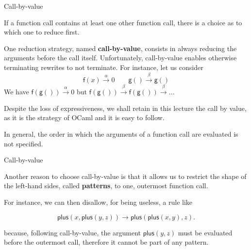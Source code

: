 \documentclass[compress,dvipdfmx]{beamer}
\newcommand{\OCaml}{\textsf{OCaml}\xspace}
\newcommand\fun[1]{\textsf{#1}}
\begin{document}
%
\begin{frame}{Call-by-value}

  If a function call contains at least one other function call, there
  is a choice as to which one to reduce first.

  \bigskip

  One reduction strategy, named \textbf{call-by-value}, consists in
  always reducing the arguments before the call itself. Unfortunately,
  call-by-value enables otherwise terminating rewrites to not
  terminate. For instance, let us consider
  \begin{equation*}
    \fun{f}(x) \xrightarrow{\alpha} 0\qquad
    \fun{g}() \xrightarrow{\beta} \fun{g}()
  \end{equation*}
  We have \(\fun{f}(\fun{g}()) \xrightarrow{\alpha} 0\) but
  \(\fun{f}(\fun{g}()) \xrightarrow{\beta} \fun{f}(\fun{g}())
  \xrightarrow{\beta} \dots\)

  \bigskip

  Despite the loss of expressiveness, we shall retain in this lecture
  the call by value, as it is the strategy of \OCaml and it is easy to
  follow.

  \bigskip

  In general, the order in which the arguments of a function call are
  evaluated is not specified.

\end{frame}

%
\begin{frame}{Call-by-value}

  Another reason to choose call-by-value is that it allows us to
  restrict the shape of the left\hyp{}hand sides, called
  \textbf{patterns}, to one, outermost function call.

  \bigskip

  For instance, we can then disallow, for being useless, a
  rule like

  \begin{equation*}
    \fun{plus}(x,\fun{plus}(y,z)) \rightarrow
    \fun{plus}(\fun{plus}(x,y),z).
  \end{equation*}

  \noindent because, following call\hyp{}by\hyp{}value, the argument
  \(\fun{plus}(y,z)\) must be evaluated before the outermost call,
  therefore it cannot be part of any pattern.

\end{frame}
\end{document}
